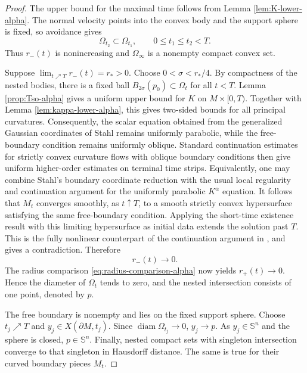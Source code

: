 \documentclass[11pt, reqno]{amsart}
\theoremstyle{remark}
\theoremstyle{definition}
\numberwithin{equation}{section}
\DeclareMathOperator{\diam}{diam}
\begin{document}
\begin{proof}
The upper bound for the maximal time follows from Lemma
\ref{lem:K-lower-alpha}.  The normal velocity points into the convex body and the support sphere is fixed, so avoidance gives
\begin{equation*}
        \Omega_{t_2}\subset\Omega_{t_1},
        \qquad 0\le t_1\le t_2<T.
\end{equation*}
Thus $r_-(t)$ is nonincreasing and $\Omega_\infty$ is a nonempty compact convex set.

Suppose $\lim_{t\nearrow T}r_-(t)=r_*>0$.  Choose $0<\sigma<r_*/4$.  By compactness of the nested bodies, there is a fixed ball $B_{2\sigma}(p_0)\subset\Omega_t$ for all $t<T$.  Lemma \ref{prop:Tso-alpha} gives a uniform upper bound for $K$ on $M\times[0,T)$. Together with Lemma \ref{lem:kappa-lower-alpha}, this gives two-sided bounds for all principal curvatures. Consequently,
the scalar equation obtained from the generalized Gaussian
coordinates of Stahl \cite[Section~2]{StahlRegularity} remains
uniformly parabolic, while the free-boundary condition remains
uniformly oblique. Standard
continuation estimates for strictly convex curvature flows with
oblique boundary conditions then give uniform higher-order
estimates on terminal time strips. Equivalently, one may combine
Stahl's boundary coordinate reduction with the usual local
regularity and continuation argument for the uniformly parabolic
$K^\alpha$ equation.  It follows
that $M_t$ converges smoothly, as $t\uparrow T$, to a smooth
strictly convex hypersurface satisfying the same free-boundary
condition. Applying the short-time existence result with this
limiting hypersurface as initial data extends the solution past
$T$. This is the fully nonlinear counterpart of the continuation
argument in \cite[Section~6.4]{StahlRegularity}, and gives a
contradiction. Therefore
\begin{equation*}
        r_-(t)\longrightarrow0.
\end{equation*}
The radius comparison \eqref{eq:radius-comparison-alpha} now yields
$r_+(t)\to0$. Hence the diameter of $\Omega_t$ tends to zero, and the nested intersection consists of one point, denoted by $p$.

The free boundary is nonempty and lies on the fixed support sphere.  Choose $t_j\nearrow T$ and $y_j\in X(\partial M,t_j)$. Since
$\diam\Omega_{t_j}\to 0$, $y_j\to p$. As $y_j\in\mathbb{S}^n$ and the sphere is closed, $p\in\mathbb{S}^n$. Finally, nested compact sets with singleton intersection converge to that singleton in Hausdorff distance. The same is true for their curved boundary pieces $M_t$.
\end{proof}
\end{document}
